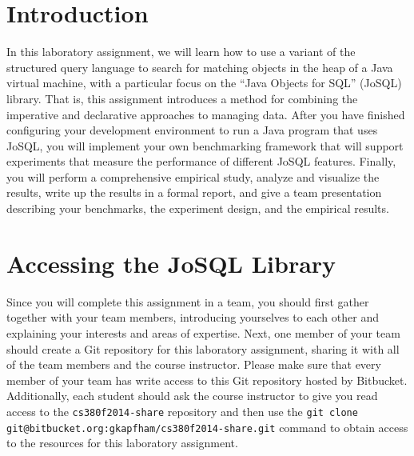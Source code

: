


\usepackage[compact]{titlesec}



\section*{Introduction}

In this laboratory assignment, we will learn how to use a variant of the structured query language to search for
matching objects in the heap of a Java virtual machine, with a particular focus on the ``Java Objects for SQL'' (JoSQL)
library. That is, this assignment introduces a method for combining the imperative and declarative approaches to
managing data. After you have finished configuring your development environment to run a Java program that uses JoSQL,
you will implement your own benchmarking framework that will support experiments that measure the performance of
different JoSQL features.  Finally, you will perform a comprehensive empirical study, analyze and visualize the results,
write up the results in a formal report, and give a team presentation describing your benchmarks, the experiment
design, and the empirical results.

\section*{Accessing the JoSQL Library}

Since you will complete this assignment in a team, you should first gather together with your team members, introducing
yourselves to each other and explaining your interests and areas of expertise. Next, one member of your team should
create a Git repository for this laboratory assignment, sharing it with all of the team members and the course
instructor. Please make sure that every member of your team has write access to this Git repository hosted by Bitbucket.
Additionally, each student should ask the course instructor to give you read access to the {\tt cs380f2014-share}
repository and then use the {\tt git clone git@bitbucket.org:gkapfham/cs380f2014-share.git} command to obtain access to
the resources for this laboratory assignment.

